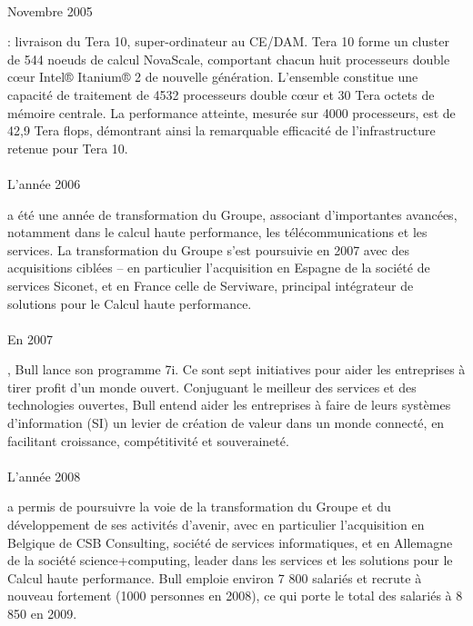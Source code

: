 \documentclass{article}
\begin{document}
		\paragraph{}
		\begin{bf}Novembre 2005\end{bf} : livraison du Tera 10, super-ordinateur au CE/DAM. Tera 10 forme un cluster de 
		544 noeuds de calcul NovaScale, comportant chacun huit processeurs double cœur Intel® Itanium® 2 de nouvelle 
		génération. L'ensemble constitue une capacité de traitement de 4532 processeurs double cœur et 30 Tera octets de 
		mémoire centrale. La performance atteinte, mesurée sur 4000 processeurs, est de 42,9 Tera flops, démontrant ainsi la 
		remarquable efficacité de l’infrastructure retenue pour Tera 10.
		\paragraph{}
		\begin{bf}L’année 2006\end{bf} a été une année de transformation du Groupe, associant d’importantes avancées, 
		notamment dans le calcul haute performance, les télécommunications et les services.
		La transformation du Groupe s’est poursuivie en 2007 avec des acquisitions ciblées – en particulier l’acquisition 
		en Espagne de la société de services Siconet, et en France celle de Serviware, principal intégrateur de solutions pour 
		le Calcul haute performance.
		\paragraph{}
		\begin{bf}En 2007\end{bf}, Bull lance son programme 7i. Ce sont sept initiatives pour aider les entreprises à 
		tirer profit d’un monde ouvert. Conjuguant le meilleur des services et des technologies ouvertes, Bull entend aider 
		les entreprises à faire de leurs systèmes d’information (SI) un levier de création de valeur dans un monde connecté, 
		en facilitant croissance, compétitivité et souveraineté.
		\paragraph{}
		\begin{bf}L’année 2008\end{bf} a permis de poursuivre la voie de la transformation du Groupe et du développement de 
		ses activités d’avenir, avec en particulier l’acquisition en Belgique de CSB Consulting, société de services 
		informatiques, et en Allemagne de la société science+computing, leader dans les services et les solutions pour le 
		Calcul haute performance.
		Bull emploie environ 7 800 salariés et recrute à nouveau fortement (1000 personnes en 2008), ce qui porte le total des 
		salariés à 8 850 en 2009.
\end{document}
